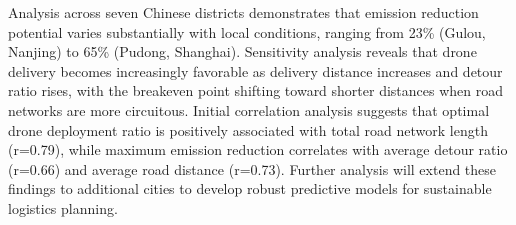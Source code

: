 \documentclass[11pt]{article}
\begin{document}
Analysis across seven Chinese districts demonstrates that emission reduction potential varies substantially with local conditions, ranging from 23\% (Gulou, Nanjing) to 65\% (Pudong, Shanghai). Sensitivity analysis reveals that drone delivery becomes increasingly favorable as delivery distance increases and detour ratio rises, with the breakeven point shifting toward shorter distances when road networks are more circuitous. Initial correlation analysis suggests that optimal drone deployment ratio is positively associated with total road network length (r=0.79), while maximum emission reduction correlates with average detour ratio (r=0.66) and average road distance (r=0.73). Further analysis will extend these findings to additional cities to develop robust predictive models for sustainable logistics planning.






\end{document}
